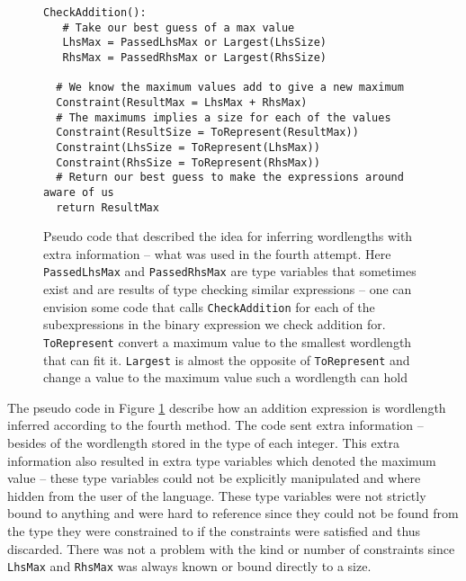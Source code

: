 \begin{figure}[h!]
\begin{verbatim}
CheckAddition():
   # Take our best guess of a max value
   LhsMax = PassedLhsMax or Largest(LhsSize)
   RhsMax = PassedRhsMax or Largest(RhsSize)

  # We know the maximum values add to give a new maximum
  Constraint(ResultMax = LhsMax + RhsMax)
  # The maximums implies a size for each of the values
  Constraint(ResultSize = ToRepresent(ResultMax))
  Constraint(LhsSize = ToRepresent(LhsMax))
  Constraint(RhsSize = ToRepresent(RhsMax))
  # Return our best guess to make the expressions around aware of us
  return ResultMax
\end{verbatim}
  \cprotect\caption{Pseudo code that described the idea for inferring wordlengths with extra information -- what was used in the fourth attempt. Here \verb+PassedLhsMax+ and \verb+PassedRhsMax+ are type variables that sometimes exist and are results of type checking similar expressions -- one can envision some code that calls \verb+CheckAddition+ for each of the subexpressions in the binary expression we check addition for. \verb+ToRepresent+ convert a maximum value to the smallest wordlength that can fit it. \verb+Largest+ is almost the opposite of \verb+ToRepresent+ and change a value to the maximum value such a wordlength can hold}
\label{fig:pseudoFour}
\end{figure}

The pseudo code in Figure \ref{fig:pseudoFour} describe how an addition expression is wordlength inferred according to the fourth method. The code sent extra information -- besides of the wordlength stored in the type of each integer. This extra information also resulted in extra type variables which denoted the maximum value -- these type variables could not be explicitly manipulated and where hidden from the user of the language. These type variables were not strictly bound to anything and were hard to reference since they could not be found from the type they were constrained to if the constraints were satisfied and thus discarded. There was not a problem with the kind or number of constraints since \verb+LhsMax+ and \verb+RhsMax+ was always known or bound directly to a size.

